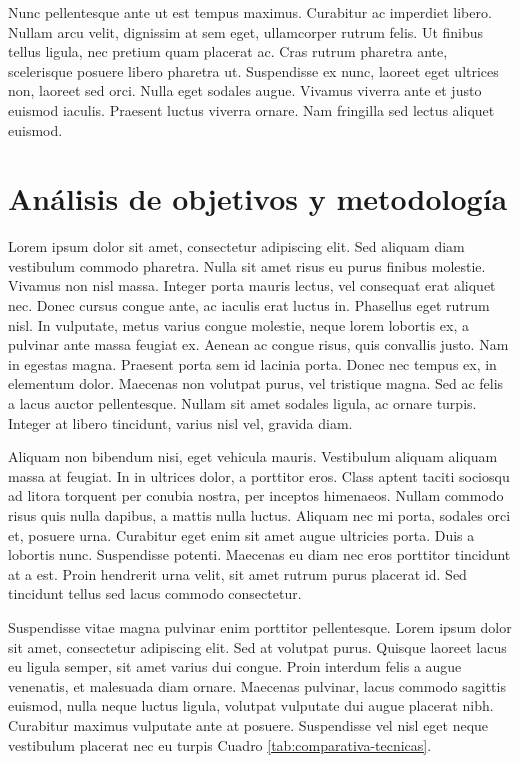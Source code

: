 Nunc pellentesque ante ut est tempus maximus. Curabitur ac imperdiet libero. Nullam arcu velit, dignissim at sem eget, ullamcorper rutrum felis. Ut finibus tellus ligula, nec pretium quam placerat ac. Cras rutrum pharetra ante, scelerisque posuere libero pharetra ut. Suspendisse ex nunc, laoreet eget ultrices non, laoreet sed orci. Nulla eget sodales augue. Vivamus viverra ante et justo euismod iaculis. Praesent luctus viverra ornare. Nam fringilla sed lectus aliquet euismod.

\chapter{Análisis de objetivos y metodología}

Lorem ipsum dolor sit amet, consectetur adipiscing elit. Sed aliquam diam vestibulum commodo pharetra. Nulla sit amet risus eu purus finibus molestie. Vivamus non nisl massa. Integer porta mauris lectus, vel consequat erat aliquet nec. Donec cursus congue ante, ac iaculis erat luctus in. Phasellus eget rutrum nisl. In vulputate, metus varius congue molestie, neque lorem lobortis ex, a pulvinar ante massa feugiat ex. Aenean ac congue risus, quis convallis justo. Nam in egestas magna. Praesent porta sem id lacinia porta. Donec nec tempus ex, in elementum dolor. Maecenas non volutpat purus, vel tristique magna. Sed ac felis a lacus auctor pellentesque. Nullam sit amet sodales ligula, ac ornare turpis. Integer at libero tincidunt, varius nisl vel, gravida diam.

Aliquam non bibendum nisi, eget vehicula mauris. Vestibulum aliquam aliquam massa at feugiat. In in ultrices dolor, a porttitor eros. Class aptent taciti sociosqu ad litora torquent per conubia nostra, per inceptos himenaeos. Nullam commodo risus quis nulla dapibus, a mattis nulla luctus. Aliquam nec mi porta, sodales orci et, posuere urna. Curabitur eget enim sit amet augue ultricies porta. Duis a lobortis nunc. Suspendisse potenti. Maecenas eu diam nec eros porttitor tincidunt at a est. Proin hendrerit urna velit, sit amet rutrum purus placerat id. Sed tincidunt tellus sed lacus commodo consectetur.

Suspendisse vitae magna pulvinar enim porttitor pellentesque. Lorem ipsum dolor sit amet, consectetur adipiscing elit. Sed at volutpat purus. Quisque laoreet lacus eu ligula semper, sit amet varius dui congue. Proin interdum felis a augue venenatis, et malesuada diam ornare. Maecenas pulvinar, lacus commodo sagittis euismod, nulla neque luctus ligula, volutpat vulputate dui augue placerat nibh. Curabitur maximus vulputate ante at posuere. Suspendisse vel nisl eget neque vestibulum placerat nec eu turpis Cuadro \ref{tab:comparativa-tecnicas}.

